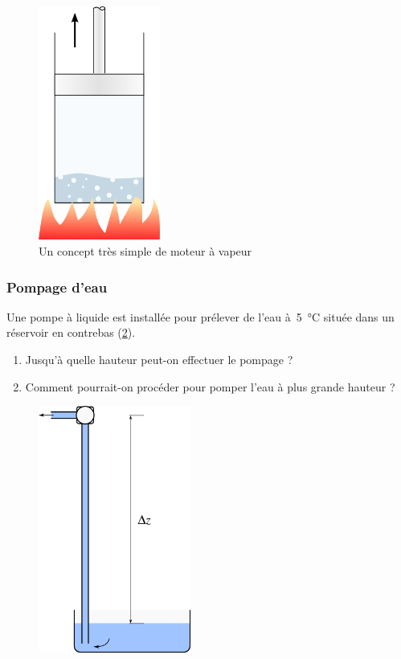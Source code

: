 	\begin{figure}[htp] %
		\begin{center}
			\includegraphics[width=4cm]{images/exercice_moteur_simple.png}
		\end{center}
		\caption{Un concept très simple de moteur à vapeur}
		\label{fig_moteurvapeursimple}
	\end{figure}


\subsubsection{Pompage d’eau}
\label{exo_pompage_baliani}

	Une pompe à liquide est installée pour prélever de l’eau à~\SI{5}{\degreeCelsius} située dans un réservoir en contrebas (\cref{fig_pompage}). 
	
	\begin{enumerate}
		\item Jusqu’à quelle hauteur peut-on effectuer le pompage ?	
		\item Comment pourrait-on procéder pour pomper l’eau à plus grande hauteur ?
	\end{enumerate}

	\begin{figure}[htp] %
		\begin{center}
			\includegraphics[width=5cm]{images/exercice_pompe_eau.png}
		\end{center}
		\label{fig_pompage}
	\end{figure}



